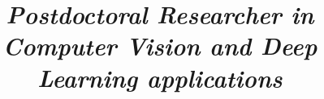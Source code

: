 \documentclass[11pt, a4paper, sans, final]{moderncv}
\title{\emph{Postdoctoral Researcher in Computer Vision and \newline Deep Learning applications}}
\begin{document}
\newcommand{\jobTitle}{Computer Vision Expert }
\newcommand{\companyName}{ asdf }



 
\end{document}
